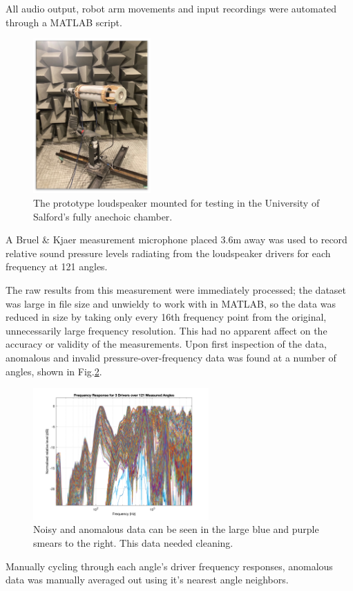 \documentclass{report}
\begin{document}
        All audio output, robot arm movements and input recordings were automated through a MATLAB script.
        \begin{figure}[H]
            \centering
            \includegraphics[width = 0.4\textwidth]{figs/speakerOnRobot.png}%
            \caption{The prototype loudspeaker mounted for testing in the University of Salford's fully anechoic chamber.}
            \label{speakerOnRobot}
        \end{figure}
        A Bruel \& Kjaer measurement microphone placed 3.6m away was used to record relative sound pressure levels radiating from the loudspeaker drivers for each frequency at 121 angles.

        The raw results from this measurement were immediately processed; the dataset was large in file size and unwieldy to work with in MATLAB, so the data was reduced in size by taking only every 16th frequency point from the original, unnecessarily large frequency resolution.
        This had no apparent affect on the accuracy or validity of the measurements.
        Upon first inspection of the data, anomalous and invalid pressure-over-frequency data was found at a number of angles, shown in Fig.\ref{allAngles}.
        \begin{figure}[H]
            \centering
            \includegraphics[width = 0.6\textwidth]{figs/allAngles.png}%
            \caption{Noisy and anomalous data can be seen in the large blue and purple smears to the right. This data needed cleaning.}
            \label{allAngles}
        \end{figure}
        Manually cycling through each angle's driver frequency responses, anomalous data was manually averaged out using it's nearest angle neighbors.
\end{document}
